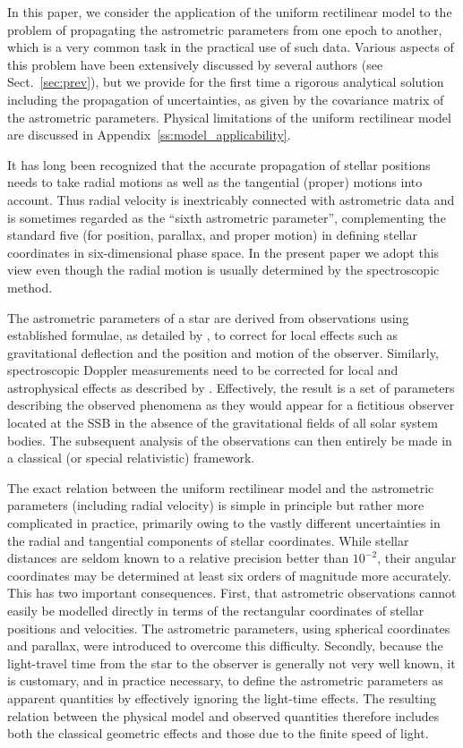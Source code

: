 \documentclass{aa}
\begin{document}
In this paper, we consider the application of the uniform rectilinear model to the problem of propagating
the astrometric parameters from one epoch to another, which is a very common task in the practical
use of such data. Various aspects of this problem have been extensively discussed by several
authors (see Sect.~\ref{sec:prev}), but we provide for the first time a rigorous analytical solution
including the propagation of uncertainties, as given by the covariance matrix of the astrometric
parameters. Physical limitations of the uniform rectilinear model are discussed in
Appendix~\ref{ss:model_applicability}.

It has long been recognized that the accurate propagation of stellar positions
needs to take radial motions as well as the tangential (proper) motions into account.
Thus radial velocity is inextricably connected with astrometric data and is sometimes
regarded as the ``sixth astrometric parameter'', complementing the standard five (for position,
parallax, and proper motion) in defining stellar coordinates in six-dimensional phase space.
In the present paper we adopt this view even though the radial motion is usually determined
by the spectroscopic method.

The astrometric parameters of a star are derived from observations using established
formulae, as detailed by \cite{klioner2003}, to correct for local effects such as gravitational
deflection and the position and motion of the observer. Similarly,
spectroscopic Doppler measurements need to be corrected for local and astrophysical
effects as described by \citet{lindegren_dravins2003}. Effectively, the result is a set of
parameters describing the observed phenomena as they would appear for a fictitious
observer located at the SSB in the absence of the gravitational fields of all solar system
bodies. The subsequent analysis of the observations can then entirely be made in a
classical (or special relativistic) framework.

The exact relation between the uniform rectilinear model and the astrometric parameters
(including radial velocity) is simple in principle but rather more complicated in practice,
primarily owing to the vastly different uncertainties in the radial and
tangential components of stellar coordinates. While stellar distances are seldom
known to a relative precision better than $10^{-2}$, their angular coordinates may be
determined at least six orders of magnitude more accurately. This has two important
consequences. First, that astrometric observations cannot easily be modelled directly
in terms of the rectangular coordinates of stellar positions and velocities. The
astrometric parameters, using spherical coordinates and parallax, were introduced to
overcome this difficulty. Secondly,
because the light-travel time from the star to the observer is generally not very well
known, it is customary, and in practice necessary, to define the astrometric parameters
as apparent quantities by effectively ignoring the light-time effects. The resulting
relation between the physical model and observed quantities therefore includes
both the classical geometric effects and those due to the finite speed of light.
\end{document}
